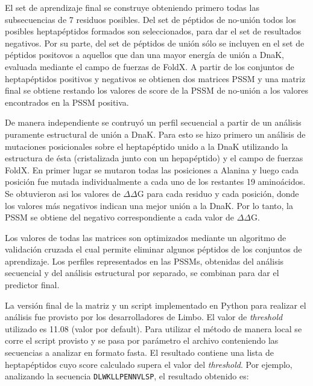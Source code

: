 El set de aprendizaje final se construye obteniendo primero todas las subsecuencias de 7 residuos posibles. 
Del set de péptidos de no-unión todos los posibles heptapéptidos formados son seleccionados, para dar el set de resultados negativos.
Por su parte, del set de péptidos de unión sólo se incluyen en el set de péptidos positovos a aquellos que dan una mayor energía de unión a DnaK, evaluada mediante el campo de fuerzas de FoldX.
A partir de los conjuntos de heptapéptidos positivos y negativos se obtienen dos matrices PSSM y una matriz final se obtiene restando los valores de score de la PSSM de no-unión a los valores encontrados en la PSSM positiva.

De manera independiente se contruyó un perfil secuencial a partir de un análisis puramente estructural de unión a DnaK.
Para esto se hizo primero un análisis de mutaciones posicionales sobre el heptapéptido unido a la DnaK utilizando la estructura de ésta (cristalizada junto con un hepapéptido) y el campo de fuerzas FoldX. 
En primer lugar se mutaron todas las posiciones a Alanina y luego cada posición fue mutada individualmente a cada uno de los restantes 19 aminoácidos.
Se obtuvieron asi los valores de $\Delta\Delta$G para cada residuo y cada posición, donde los valores más negativos indican una mejor unión a la DnaK.
Por lo tanto, la PSSM se obtiene del negativo correspondiente a cada valor de $\Delta\Delta$G.

Los valores de todas las matrices son optimizados mediante un algoritmo de validación cruzada el cual permite eliminar algunos péptidos de los conjuntos de aprendizaje.
Los perfiles representados en las PSSMs, obtenidas del análisis secuencial y del análisis estructural por separado, se combinan para dar el predictor final. 


La versión final de la matriz y un script implementado en Python para realizar el análisis fue provisto por los desarrolladores de Limbo.
El valor de \textit{threshold} utilizado es 11.08 (valor por default). Para utilizar el método de manera local se corre el script provisto y se pasa por parámetro el archivo conteniendo las secuencias a analizar en formato fasta.
El resultado contiene una lista de heptapéptidos cuyo score calculado supera el valor del \textit{threshold}.
Por ejemplo, analizando la secuencia \texttt{DLWKLLPENNVLSP}, el resultado obtenido es:

